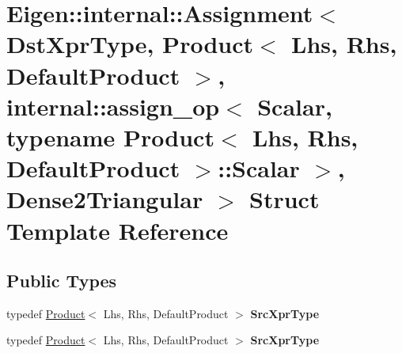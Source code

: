 \hypertarget{struct_eigen_1_1internal_1_1_assignment_3_01_dst_xpr_type_00_01_product_3_01_lhs_00_01_rhs_00_0193a1d113168a246bb6cb34430a4d0595}{}\section{Eigen\+:\+:internal\+:\+:Assignment$<$ Dst\+Xpr\+Type, Product$<$ Lhs, Rhs, Default\+Product $>$, internal\+:\+:assign\+\_\+op$<$ Scalar, typename Product$<$ Lhs, Rhs, Default\+Product $>$\+:\+:Scalar $>$, Dense2\+Triangular $>$ Struct Template Reference}
\label{struct_eigen_1_1internal_1_1_assignment_3_01_dst_xpr_type_00_01_product_3_01_lhs_00_01_rhs_00_0193a1d113168a246bb6cb34430a4d0595}
\subsection*{Public Types}
\begin{DoxyCompactItemize}
\item 
\mbox{\label{struct_eigen_1_1internal_1_1_assignment_3_01_dst_xpr_type_00_01_product_3_01_lhs_00_01_rhs_00_0193a1d113168a246bb6cb34430a4d0595_ab58ff4f79362d670c01cc6fa4d8f238d}} 
typedef \hyperlink{group___core___module_class_eigen_1_1_product}{Product}$<$ Lhs, Rhs, Default\+Product $>$ {\bfseries Src\+Xpr\+Type}
\item 
\mbox{\label{struct_eigen_1_1internal_1_1_assignment_3_01_dst_xpr_type_00_01_product_3_01_lhs_00_01_rhs_00_0193a1d113168a246bb6cb34430a4d0595_ab58ff4f79362d670c01cc6fa4d8f238d}} 
typedef \hyperlink{group___core___module_class_eigen_1_1_product}{Product}$<$ Lhs, Rhs, Default\+Product $>$ {\bfseries Src\+Xpr\+Type}
\end{DoxyCompactItemize}
